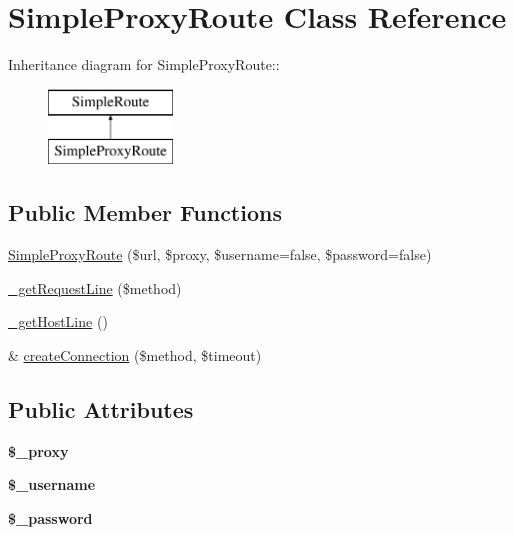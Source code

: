 \hypertarget{class_simple_proxy_route}{
\section{SimpleProxyRoute Class Reference}
\label{class_simple_proxy_route}
}
Inheritance diagram for SimpleProxyRoute::\begin{figure}[H]
\begin{center}
\leavevmode
\includegraphics[height=2cm]{class_simple_proxy_route}
\end{center}
\end{figure}
\subsection*{Public Member Functions}
\begin{DoxyCompactItemize}
\item 
\hyperlink{class_simple_proxy_route_ae9dd2dbfe339569ce5fb6a68162de1a9}{SimpleProxyRoute} (\$url, \$proxy, \$username=false, \$password=false)
\item 
\hyperlink{class_simple_proxy_route_a47e158c297e31c2a2988a3a7d586ffb2}{\_\-getRequestLine} (\$method)
\item 
\hyperlink{class_simple_proxy_route_a5b9617cdd91cbcc393ea84097b5b16ce}{\_\-getHostLine} ()
\item 
\& \hyperlink{class_simple_proxy_route_a1741241e4a4d7ed555adf373008c7cf0}{createConnection} (\$method, \$timeout)
\end{DoxyCompactItemize}
\subsection*{Public Attributes}
\begin{DoxyCompactItemize}
\item 
\hypertarget{class_simple_proxy_route_ab9bbd988844052f0f2dabc50ab04e389}{
{\bfseries \$\_\-proxy}}
\label{class_simple_proxy_route_ab9bbd988844052f0f2dabc50ab04e389}

\item 
\hypertarget{class_simple_proxy_route_af2a2ba8d79eabf9178e587d9471560e0}{
{\bfseries \$\_\-username}}
\label{class_simple_proxy_route_af2a2ba8d79eabf9178e587d9471560e0}

\item 
\hypertarget{class_simple_proxy_route_a11dcc837ca3d7e857996503d5112feec}{
{\bfseries \$\_\-password}}
\label{class_simple_proxy_route_a11dcc837ca3d7e857996503d5112feec}

\end{DoxyCompactItemize}


